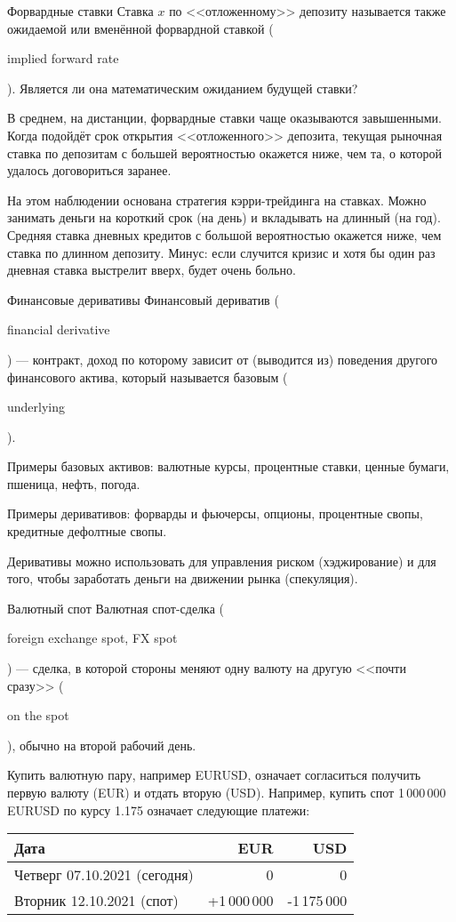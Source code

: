 \documentclass{beamer}
\newcommand{\en}[1]{\begin{otherlanguage}{english}#1\end{otherlanguage}}
\begin{document}
\begin{frame}{Форвардные ставки}
\justify 
Ставка $x$ по <<отложенному>> депозиту называется также \alert{ожидаемой или вменённой форвардной ставкой} (\en{implied forward rate}). Является ли она математическим ожиданием будущей ставки?

\justify
В среднем, на дистанции, форвардные ставки чаще оказываются завышенными. Когда подойдёт срок открытия <<отложенного>> депозита, текущая рыночная ставка по депозитам с большей вероятностью окажется ниже, чем та, о которой удалось договориться заранее. 

\justify
На этом наблюдении основана стратегия кэрри-трейдинга на ставках. Можно занимать деньги на короткий срок (на день) и вкладывать на длинный (на год). Средняя ставка дневных кредитов с большой вероятностью окажется ниже, чем ставка по длинном депозиту. Минус: если случится кризис и хотя бы один раз дневная ставка выстрелит вверх, будет очень больно.
\end{frame}



\begin{frame}{Финансовые деривативы}
\justify
\alert{Финансовый дериватив} (\en{financial derivative}) --- контракт, доход по которому зависит 
от (выводится из) поведения другого финансового актива, который называется базовым 
(\en{underlying}).

\justify
Примеры базовых активов: валютные курсы, процентные ставки, ценные бумаги, пшеница, нефть, погода.

\justify
Примеры деривативов: форварды и фьючерсы, опционы, процентные свопы, кредитные дефолтные свопы.

\justify
Деривативы можно использовать для управления риском (хэджирование) и для того, чтобы заработать деньги на движении рынка (спекуляция). 
\end{frame}



\begin{frame}{Валютный спот}
\justify
\alert{Валютная спот-сделка} (\en{foreign exchange spot, FX spot}) --- сделка, в которой стороны меняют одну валюту на другую <<почти сразу>> (\en{on the spot}), обычно на второй рабочий день.

\justify
Купить валютную пару, например EURUSD, означает согласиться получить первую валюту (EUR) и отдать вторую (USD). Например, купить спот 1\,000\,000 EURUSD по курсу 1.175 означает следующие платежи:

\justify
\centering
\begin{tabular}{l|r|r}
Дата                          & EUR & USD \\ \hline
Четверг 07.10.2021 (сегодня)  & 0   & 0   \\
Вторник 12.10.2021 (спот) & +1\,000\,000 & -1\,175\,000 
\end{tabular}
\end{frame}
\end{document}
